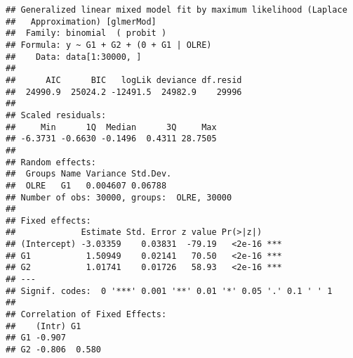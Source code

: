 \documentclass[]{article}
\newenvironment{Shaded}{\begin{snugshade}}{\end{snugshade}}
\newcommand{\CommentTok}[1]{\textcolor[rgb]{0.56,0.35,0.01}{\textit{#1}}}
\newcommand{\DataTypeTok}[1]{\textcolor[rgb]{0.13,0.29,0.53}{#1}}
\newcommand{\DecValTok}[1]{\textcolor[rgb]{0.00,0.00,0.81}{#1}}
\newcommand{\KeywordTok}[1]{\textcolor[rgb]{0.13,0.29,0.53}{\textbf{#1}}}
\newcommand{\NormalTok}[1]{#1}
\newcommand{\OperatorTok}[1]{\textcolor[rgb]{0.81,0.36,0.00}{\textbf{#1}}}
\newcommand{\StringTok}[1]{\textcolor[rgb]{0.31,0.60,0.02}{#1}}
\begin{document}
\begin{Shaded}
\end{Shaded}

\begin{verbatim}
## Generalized linear mixed model fit by maximum likelihood (Laplace
##   Approximation) [glmerMod]
##  Family: binomial  ( probit )
## Formula: y ~ G1 + G2 + (0 + G1 | OLRE)
##    Data: data[1:30000, ]
## 
##      AIC      BIC   logLik deviance df.resid 
##  24990.9  25024.2 -12491.5  24982.9    29996 
## 
## Scaled residuals: 
##     Min      1Q  Median      3Q     Max 
## -6.3731 -0.6630 -0.1496  0.4311 28.7505 
## 
## Random effects:
##  Groups Name Variance Std.Dev.
##  OLRE   G1   0.004607 0.06788 
## Number of obs: 30000, groups:  OLRE, 30000
## 
## Fixed effects:
##             Estimate Std. Error z value Pr(>|z|)    
## (Intercept) -3.03359    0.03831  -79.19   <2e-16 ***
## G1           1.50949    0.02141   70.50   <2e-16 ***
## G2           1.01741    0.01726   58.93   <2e-16 ***
## ---
## Signif. codes:  0 '***' 0.001 '**' 0.01 '*' 0.05 '.' 0.1 ' ' 1
## 
## Correlation of Fixed Effects:
##    (Intr) G1    
## G1 -0.907       
## G2 -0.806  0.580
\end{verbatim}
\end{document}
